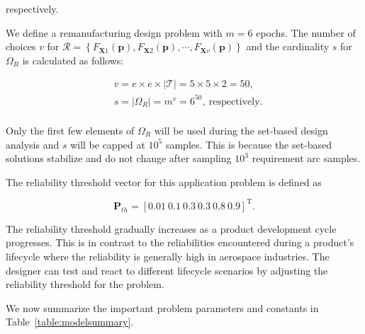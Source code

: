 respectively.

We define a remanufacturing design problem with $m = 6$ epochs. The number of choices $v$ for $\mathcal{R} = \left\{F_{\mathbf{X}1}(\mathbf{p}),F_{\mathbf{X}2}(\mathbf{p}),\cdots,F_{\mathbf{X}v}(\mathbf{p})\right\}$ and the cardinality $s$ for $\Omega_R$ is calculated as follows:

\begin{equation*}
	\begin{aligned}
		& v = e \times e \times |\mathcal{T}| = 5 \times 5 \times 2 = 50,\\
		& s = |\Omega_R| = m^v = 6^{50},~\mathrm{respectively}.\\
	\end{aligned}
\end{equation*}

Only the first few elements of $\Omega_R$ will be used during the set-based design analysis and $s$ will be capped at $10^5$ samples. This is because the set-based solutions stabilize and do not change after sampling $10^3$ requirement arc samples.

The reliability threshold vector for this application problem is defined as 

\begin{equation*}
    \mathbf{P}_{th} = \left[0.01 ~ 0.1 ~ 0.3 ~ 0.3 ~ 0.8 ~ 0.9\right]^{\mathrm{T}}.
\end{equation*}

The reliability threshold gradually increases as a product development cycle progresses. This is in contrast to the reliabilities encountered during a product's lifecycle where the reliability is generally high in aerospace industries. The designer can test and react to different lifecycle scenarios by adjusting the reliability threshold for the problem.

We now summarize the important problem parameters and constants in Table~\ref{table:modelsummary}.

